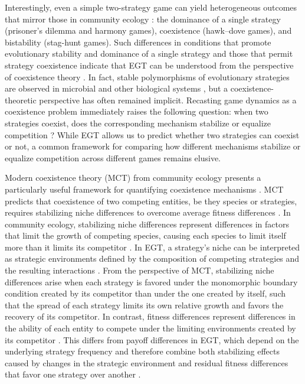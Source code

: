 \documentclass[12pt]{article}
\begin{document}
Interestingly, even a simple two-strategy game can yield heterogeneous outcomes that mirror those in community ecology \citep{hauert2002effects,szabo2007evolutionary,cooney2020analysis,tarnita2025reconciling}: the dominance of a single strategy (prisoner’s dilemma and harmony games), coexistence (hawk–dove games), and bistability (stag-hunt games).
Such differences in conditions that promote evolutionary stability and dominance of a single strategy and those that permit strategy coexistence indicate that EGT can be understood from the perspective of coexistence theory \citep{motro1991co,doebeli2004evolutionary,hauert2004spatial,doebeli2005models,gore2009snowdrift,souza2009evolution,archetti2011coexistence,steidinger2014coexistence,tarnita2025reconciling}.
In fact, stable polymorphisms of evolutionary strategies are observed in microbial and other biological systems \citep{gore2009snowdrift,cordero2012public,kocher2018genetic,pollak2021public,lin2024interspecific}, but a coexistence-theoretic perspective has often remained implicit.
Recasting game dynamics as a coexistence problem immediately raises the following question: when two strategies coexist, does the corresponding mechanism stabilize or equalize competition \citep{chesson2000mechanisms}?
While EGT allows us to predict whether two strategies can coexist or not, a common framework for comparing how different mechanisms stabilize or equalize competition across different games remains elusive.

Modern coexistence theory (MCT) from community ecology presents a particularly useful framework for quantifying coexistence mechanisms \citep{chesson2000mechanisms,adler2007niche,godoy2014phylogenetic,godoy2014phenology,kraft2015plant,adler2026have}. 
MCT predicts that coexistence of two competing entities, be they species or strategies, requires stabilizing niche differences to overcome average fitness differences \citep{chesson2000mechanisms,adler2007niche,kraft2015plant}.
In community ecology, stabilizing niche differences represent differences in factors that limit the growth of competing species, causing each species to limit itself more than it limits its competitor \citep{chesson2000mechanisms}.
In EGT, a strategy’s niche can be interpreted as strategic environments defined by the composition of competing strategies and the resulting interactions \citep{taylor1978evolutionary,cressman2014replicator,tarnita2025reconciling}.
From the perspective of MCT, stabilizing niche differences arise when each strategy is favored under the monomorphic boundary condition created by its competitor than under the one created by itself, such that the spread of each strategy limits its own relative growth and favors the recovery of its competitor.
In contrast, fitness differences represent differences in the ability of each entity to compete under the limiting environments created by its competitor \citep{chesson2000mechanisms}.
This differs from payoff differences in EGT, which depend on the underlying strategy frequency and therefore combine both stabilizing effects caused by changes in the strategic environment and residual fitness differences that favor one strategy over another \citep{taylor1978evolutionary,cressman2014replicator,tarnita2025reconciling}.
\end{document}
